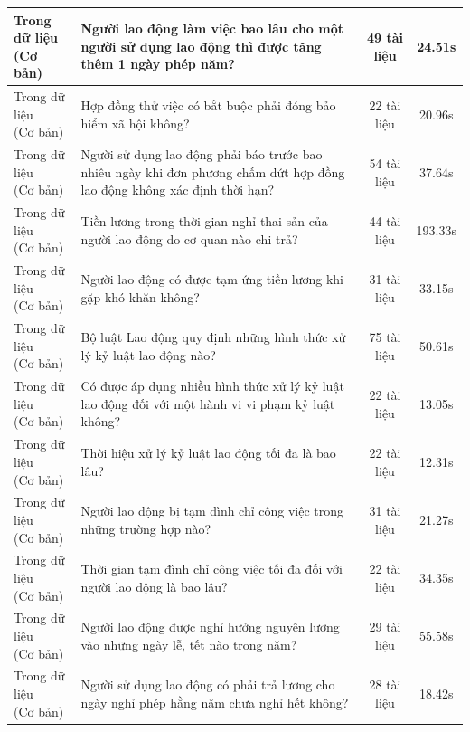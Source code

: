 \begin{longtable}{|l|p{6.5cm}|c|c|}
\makecell[l]{Trong dữ liệu\\(Cơ bản)} & Người lao động làm việc bao lâu cho một người sử dụng lao động thì được tăng thêm 1 ngày phép năm? & 49 tài liệu & 24.51s \\ \hline
\makecell[l]{Trong dữ liệu\\(Cơ bản)} & Hợp đồng thử việc có bắt buộc phải đóng bảo hiểm xã hội không? & 22 tài liệu & 20.96s \\ \hline
\makecell[l]{Trong dữ liệu\\(Cơ bản)} & Người sử dụng lao động phải báo trước bao nhiêu ngày khi đơn phương chấm dứt hợp đồng lao động không xác định thời hạn? & 54 tài liệu & 37.64s \\ \hline
\makecell[l]{Trong dữ liệu\\(Cơ bản)} & Tiền lương trong thời gian nghỉ thai sản của người lao động do cơ quan nào chi trả? & 44 tài liệu & 193.33s \\ \hline
\makecell[l]{Trong dữ liệu\\(Cơ bản)} & Người lao động có được tạm ứng tiền lương khi gặp khó khăn không? & 31 tài liệu & 33.15s \\ \hline
\makecell[l]{Trong dữ liệu\\(Cơ bản)} & Bộ luật Lao động quy định những hình thức xử lý kỷ luật lao động nào? & 75 tài liệu & 50.61s \\ \hline
\makecell[l]{Trong dữ liệu\\(Cơ bản)} & Có được áp dụng nhiều hình thức xử lý kỷ luật lao động đối với một hành vi vi phạm kỷ luật không? & 22 tài liệu & 13.05s \\ \hline
\makecell[l]{Trong dữ liệu\\(Cơ bản)} & Thời hiệu xử lý kỷ luật lao động tối đa là bao lâu? & 22 tài liệu & 12.31s \\ \hline
\makecell[l]{Trong dữ liệu\\(Cơ bản)} & Người lao động bị tạm đình chỉ công việc trong những trường hợp nào? & 31 tài liệu & 21.27s \\ \hline
\makecell[l]{Trong dữ liệu\\(Cơ bản)} & Thời gian tạm đình chỉ công việc tối đa đối với người lao động là bao lâu? & 22 tài liệu & 34.35s \\ \hline
\makecell[l]{Trong dữ liệu\\(Cơ bản)} & Người lao động được nghỉ hưởng nguyên lương vào những ngày lễ, tết nào trong năm? & 29 tài liệu & 55.58s \\ \hline
\makecell[l]{Trong dữ liệu\\(Cơ bản)} & Người sử dụng lao động có phải trả lương cho ngày nghỉ phép hằng năm chưa nghỉ hết không? & 28 tài liệu & 18.42s \\ \hline

\end{longtable}
